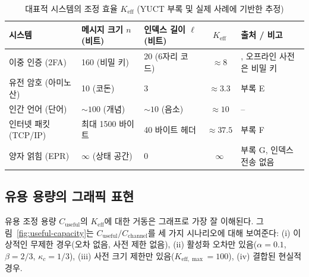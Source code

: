 \documentclass[12pt,a4paper]{article}
\newcommand{\Keff}{K_{\mathrm{eff}}}
\newcommand{\Keffmax}{K_{\mathrm{eff},\max}}
\begin{document}
	\begin{table}[htbp]
		\centering
		\caption{대표적 시스템의 조정 효율 $\Keff$ (YUCT 부록 및 실제 사례에 기반한 추정)}
		\label{tab:keff-examples}
		\footnotesize
		\begin{tabularx}{\textwidth}{XXXcX}
			\toprule
			시스템 & 메시지 크기 $n$ (비트) & 인덱스 길이 $\ell$ (비트) & $\Keff$ & 출처 / 비고 \\
			\midrule
			이중 인증 (2FA) & 160 (비밀 키) & 20 (6자리 코드) & $\approx 8$ & \cite{Yakushev2026b}, 오프라인 사전은 비밀 키 \\
			유전 암호 (아미노산) & 10 (코돈) & 3 & $\approx 3.3$ & 부록 E \\
			인간 언어 (단어) & $\sim 100$ (개념) & $\sim 10$ (음소) & $\approx 10$ & – \\
			인터넷 패킷 (TCP/IP) & 최대 1500 바이트 & 40 바이트 헤더 & $\approx 37.5$ & 부록 F \\
			양자 얽힘 (EPR) & $\infty$ (상태 공간) & 0 & $\infty$ & 부록 G, 인덱스 전송 없음 \\
			\bottomrule
		\end{tabularx}
	\end{table}
	
	\subsection{유용 용량의 그래픽 표현}
	\label{sec:graphical}
	
	유용 조정 용량 $C_{\text{useful}}$의 $\Keff$에 대한 거동은 그래프로 가장 잘 이해된다. 그림~\ref{fig:useful-capacity}는 $C_{\text{useful}}/C_{\text{channel}}$를 세 가지 시나리오에 대해 보여준다: (i) 이상적인 무제한 경우(오차 없음, 사전 제한 없음), (ii) 활성화 오차만 있음($\alpha=0.1$, $\beta=2/3$, $\kappa_c=1/3$), (iii) 사전 크기 제한만 있음($\Keffmax=100$), (iv) 결합된 현실적 경우.
	
\end{document}
